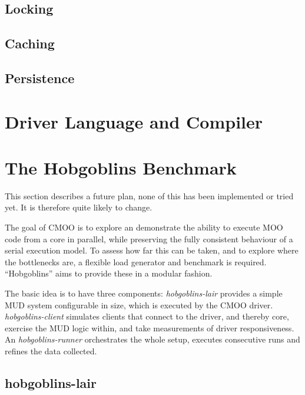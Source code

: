 \documentclass[12pt,a4paper]{article}
\let\oldsection\section
\renewcommand\section{\clearpage\oldsection}
\begin{document}
\subsection{Locking}\label{sec:locking}

\subsection{Caching}\label{sec:caching}

\subsection{Persistence}\label{sec:persistence}

\section{Driver Language and Compiler}\label{sec:compiler}

\section{The Hobgoblins Benchmark}\label{sec:hobgoblins}

\begin{notes}
\item This section describes a future plan, none of this has been implemented or
tried yet. It is therefore quite likely to change.
\end{notes}

The goal of CMOO is to explore an demonstrate the ability to execute MOO code
from a core in parallel, while preserving the fully consistent behaviour of a
serial execution model. To assess how far this can be taken, and to explore where the
bottlenecks are, a flexible load generator and benchmark is required. ``Hobgoblins'' 
aims to provide these in a modular fashion.

The basic idea is to have three components: {\em hobgoblins-lair} provides a
simple MUD system configurable in size, which is executed by the CMOO driver.
{\em hobgoblins-client} simulates clients that connect to the driver, and thereby
core, exercise the MUD logic within, and take measurements of driver
responsiveness. An {\em hobgoblins-runner} orchestrates the whole setup, executes 
consecutive runs and refines the data collected.

\subsection{hobgoblins-lair}\label{sec:hg_lair}
\end{document}
